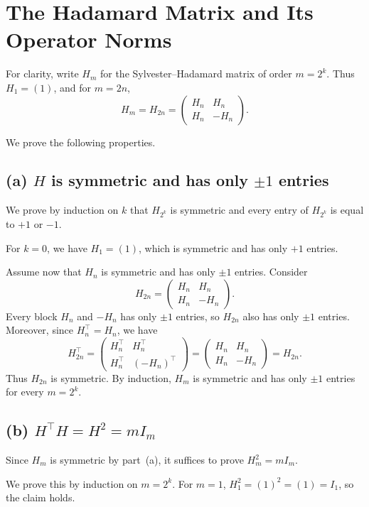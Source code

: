 \section{The Hadamard Matrix and Its Operator Norms}

For clarity, write $H_m$ for the Sylvester--Hadamard matrix of order $m=2^k$. Thus $H_1=(1)$, and for $m=2n$,
\[
H_m = H_{2n} = \begin{pmatrix} H_n & H_n\\ H_n & -H_n \end{pmatrix}.
\]

We prove the following properties.

\subsection*{(a) $H$ is symmetric and has only $\pm 1$ entries}

We prove by induction on $k$ that $H_{2^k}$ is symmetric and every entry of $H_{2^k}$ is equal to $+1$ or $-1$.

For $k=0$, we have $H_1=(1)$, which is symmetric and has only $+1$ entries.

Assume now that $H_n$ is symmetric and has only $\pm 1$ entries. Consider
\[
H_{2n} = \begin{pmatrix} H_n & H_n\\ H_n & -H_n \end{pmatrix}.
\]
Every block $H_n$ and $-H_n$ has only $\pm 1$ entries, so $H_{2n}$ also has only $\pm 1$ entries. Moreover, since $H_n^\top=H_n$, we have
\[
H_{2n}^\top = \begin{pmatrix} H_n^\top & H_n^\top\\ H_n^\top & (-H_n)^\top \end{pmatrix} = \begin{pmatrix} H_n & H_n\\ H_n & -H_n \end{pmatrix} = H_{2n}.
\]
Thus $H_{2n}$ is symmetric. By induction, $H_m$ is symmetric and has only $\pm 1$ entries for every $m=2^k$.

\subsection*{(b) $H^\top H=H^2=mI_m$}

Since $H_m$ is symmetric by part~(a), it suffices to prove $H_m^2=mI_m$.

We prove this by induction on $m=2^k$. For $m=1$, $H_1^2=(1)^2=(1)=I_1$, so the claim holds.

